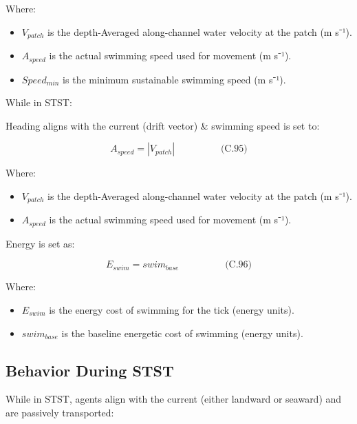 \documentclass[
]{book}
\providecommand{\tightlist}{%
  \setlength{\itemsep}{0pt}\setlength{\parskip}{0pt}}
\begin{document}
Where:

\begin{itemize}
\tightlist
\item
  \(V_{patch}\) is the depth-Averaged along-channel water velocity at
  the patch (m s⁻¹).
\item
  \(A_{speed}\) is the actual swimming speed used for movement (m s⁻¹).
\item
  \(Speed_{min}\) is the minimum sustainable swimming speed (m s⁻¹).
\end{itemize}

While in STST:

Heading aligns with the current (drift vector) \& swimming speed is set
to:

\[
\begin{equation} A_{speed} = |V_{patch}|  \hspace{2cm} \text{(C.95)} \end{equation}
\]

Where:

\begin{itemize}
\tightlist
\item
  \(V_{patch}\) is the depth-Averaged along-channel water velocity at
  the patch (m s⁻¹).
\item
  \(A_{speed}\) is the actual swimming speed used for movement (m s⁻¹).
\end{itemize}

Energy is set as:

\[
\begin{equation} E_{swim} = swim_{base}  \hspace{2cm} \text{(C.96)} \end{equation}
\]

Where:

\begin{itemize}
\tightlist
\item
  \(E_{swim}\) is the energy cost of swimming for the tick (energy
  units).
\item
  \(swim_{base}\) is the baseline energetic cost of swimming (energy
  units).
\end{itemize}

\subsection{Behavior During STST}\label{behavior-during-stst}

While in STST, agents align with the current (either landward or
seaward) and are passively transported:
\end{document}
